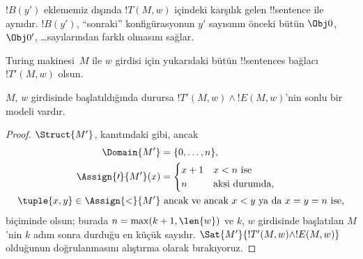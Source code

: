 \documentclass[../../../include/open-logic-section]{subfiles}
\begin{document}
\begin{enumerate}
$!B(y')$ eklememiz dışında $!T(M,w)$ içindeki karşılık gelen !!{sentence}
ile aynıdır. $!B(y')$, ``sonraki'' konfigürasyonun $y'$ sayısının önceki
bütün $\Obj 0$, $\Obj 0'$, \dots sayılarından farklı olmasını sağlar.
\end{enumerate}
Turing makinesi~$M$ ile $w$ girdisi için yukarıdaki bütün !!{sentence}s
bağlacı $!T'(M,w)$ olsun.

\begin{lem}
  $M$, $w$ girdisinde başlatıldığında durursa
  $!T'(M,w)\land !E(M,w)$'nin sonlu bir modeli vardır.
\end{lem}

\begin{proof}
  $\Struct{M'}$,  kanıtındaki gibi, ancak
  \begin{align*}
    \Domain{M'} & = \{0, \dots, n\},\\
    \Assign{\prime}{M'}(x) & = 
    \begin{cases}
      x + 1 &\text{$x < n$ ise}\\
      n &\text{aksi durumda,}
    \end{cases} \\
    \tuple{x,y} \in \Assign{<}{M'} &\text{ ancak ve ancak $x < y$ ya da $x = y = n$ ise,}
  \end{align*}
  biçiminde olsun; burada $n=\max(k+1,\len{w})$ ve $k$, $w$ girdisinde
  başlatılan $M$'nin $k$ adım sonra durduğu en küçük sayıdır.
  $\Sat{M'}{!T'(M,w)\land !E(M,w)}$ olduğunun doğrulanmasını alıştırma olarak
  bırakıyoruz.
\end{proof}
\end{document}
